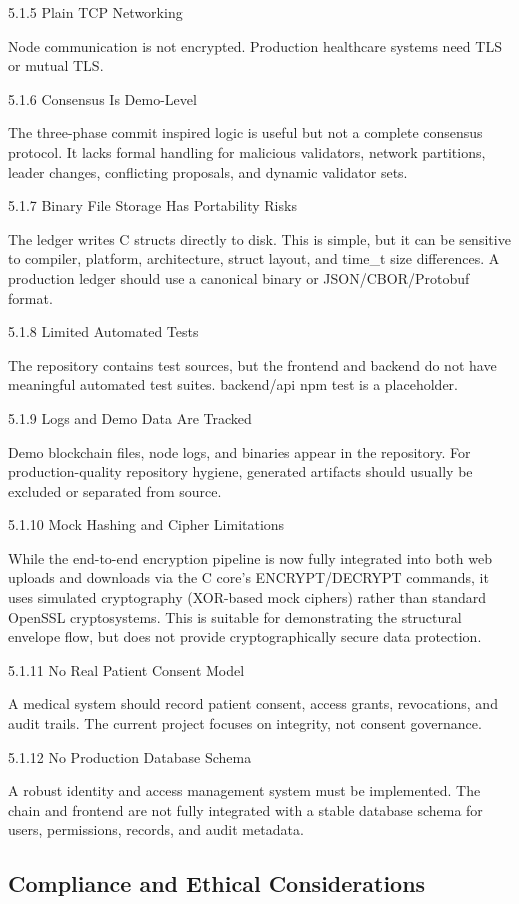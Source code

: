 \documentclass[12pt]{article}
\begin{document}
5.1.5 Plain TCP Networking

Node communication is not encrypted. Production healthcare systems need TLS or mutual TLS.

5.1.6 Consensus Is Demo-Level

The three-phase commit inspired logic is useful but not a complete consensus protocol. It lacks formal handling for malicious validators, network partitions, leader changes, conflicting proposals, and dynamic validator sets.

5.1.7 Binary File Storage Has Portability Risks

The ledger writes C structs directly to disk. This is simple, but it can be sensitive to compiler, platform, architecture, struct layout, and time\_t size differences. A production ledger should use a canonical binary or JSON/CBOR/Protobuf format.

5.1.8 Limited Automated Tests

The repository contains test sources, but the frontend and backend do not have meaningful automated test suites. backend/api npm test is a placeholder.

5.1.9 Logs and Demo Data Are Tracked

Demo blockchain files, node logs, and binaries appear in the repository. For production-quality repository hygiene, generated artifacts should usually be excluded or separated from source.

5.1.10 Mock Hashing and Cipher Limitations

While the end-to-end encryption pipeline is now fully integrated into both web uploads and downloads via the C core's ENCRYPT/DECRYPT commands, it uses simulated cryptography (XOR-based mock ciphers) rather than standard OpenSSL cryptosystems. This is suitable for demonstrating the structural envelope flow, but does not provide cryptographically secure data protection.

5.1.11 No Real Patient Consent Model

A medical system should record patient consent, access grants, revocations, and audit trails. The current project focuses on integrity, not consent governance.

5.1.12 No Production Database Schema

A robust identity and access management system must be implemented. The chain and frontend are not fully integrated with a stable database schema for users, permissions, records, and audit metadata.

\subsection{Compliance and Ethical Considerations}
\end{document}
